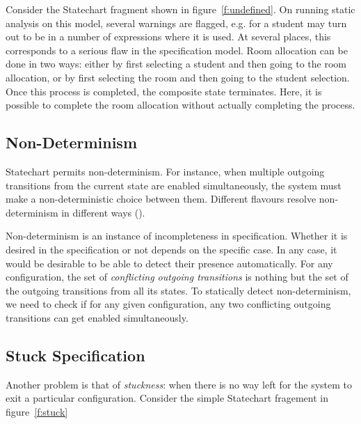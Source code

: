 \documentclass[12pt,a4paper]{article}
\begin{document}
Consider the Statechart fragment shown in figure~\ref{f:undefined}. On running static analysis on this model, several warnings are flagged, e.g. \lstinline@roomNumber@ for a student may turn out to be \lstinline@nil@ in a number of expressions where it is used. At several places, this corresponds to a serious flaw in the specification model. Room allocation can be done in two ways: either by first selecting a student and then going to the room allocation, or by first selecting the room and then going to the student selection. Once this process is completed, the composite state \lstinline@AllocateRoom@ terminates. Here, it is possible to complete the room allocation without actually completing the process. 

\subsection{Non-Determinism}
Statechart permits non-determinism. For instance, when multiple outgoing transitions from the current state are enabled simultaneously, the system must make a non-deterministic choice between them. Different flavours resolve non-determinism in different ways ().

Non-determinism is an instance of incompleteness in specification. Whether it is desired in the specification or not depends on the specific case. In any case, it would be desirable to be able to detect their presence automatically. For any configuration, the set of \emph{conflicting outgoing transitions} is nothing but the set of the outgoing transitions from all its states. To statically detect non-determinism, we need to check if for any given configuration, any two conflicting outgoing transitions can get enabled simultaneously.


\subsection{Stuck Specification}
Another problem is that of \emph{stuckness}: when there is no way left for the system to exit a particular configuration. Consider the simple Statechart fragement in figure~\ref{f:stuck}
\end{document}

